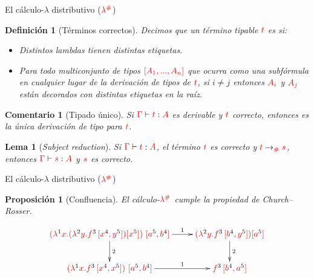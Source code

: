 \documentclass{beamer}
\newtheorem{defes}{Definición}
\newtheorem{lemes}{Lema}
\newtheorem{proes}{Proposición}
\newtheorem{comes}{Comentario}
\newcommand{\cDist}[1]{{\color{red} #1}}
\newcommand{\clambdadist}{\cDist{\lambdadist}}
\newcommand{\cLab}[1]{{\color{black} #1}}
\begin{document}
\begin{frame}{El cálculo-$\lambda$ distributivo ($\clambdadist$)}
\begin{defes}[Términos correctos]
Decimos que un término tipable $\cDist{t}$ es  si:
\begin{itemize}
\item Distintos lambdas tienen distintas etiquetas.
\item Para todo multiconjunto de tipos $\cDist{[A_1, ..., A_n]}$ que ocurra como una subfórmula
en cualquier lugar de la derivación de tipos de $\cDist{t}$, si $i\neq j$ entonces
$\cDist{A_i}$ y $\cDist{A_j}$ están decorados con distintas etiquetas en la raíz.
\end{itemize}
\end{defes}

\begin{comes}[Tipado único]
Si $\cDist{\tctx} \vdash \cDist{t} : \cDist{A}$ es derivable y $\cDist{t}$ correcto,
entonces es la única derivación de tipo para $\cDist{t}$.
\end{comes}

\begin{lemes}[\emph{Subject reduction}]
Si $\cDist{\tctx} \vdash \cDist{t} : \cDist{A}$, el término $\cDist{t}$
es correcto y $\cDist{t} \to_{\cDist{\dist}} \cDist{s}$,
entonces $\cDist{\tctx} \vdash \cDist{s} : \cDist{A}$ y $\cDist{s}$ es correcto.
\end{lemes}
\end{frame}


\begin{frame}{El cálculo-$\lambda$ distributivo ($\clambdadist$)}
\begin{proes}[Confluencia]
El cálculo-$\clambdadist$ cumple la propiedad de Church--Rosser.
\end{proes}
\[
\xymatrix{
  \cDist{(\lamp{\cLab1}{x}{(\lamp{\cLab2}{y}{f^{\cLab3}\,[x^{\cLab4}, y^{\cLab5}]}) [x^{\cLab5}]})\ [a^{\cLab5}, b^{\cLab4}]} \ar^-{2}[d] \ar^-{1}[r] & \cDist{(\lamp{\cLab2}{y}{f^{\cLab3}\,[b^{\cLab4}, y^{\cLab5}]}) [a^{\cLab5}]} \ar^-{2}[d] \\
  \cDist{(\lamp{\cLab1}{x}{f^{\cLab3}\,[x^{\cLab4}, x^{\cLab5}]})\ [a^{\cLab5}, b^{\cLab4}]} \ar^-{1}[r] & \cDist{f^{\cLab3}\,[b^{\cLab4}, a^{\cLab5}]}\\
}
\]
\end{frame}
\end{document}
